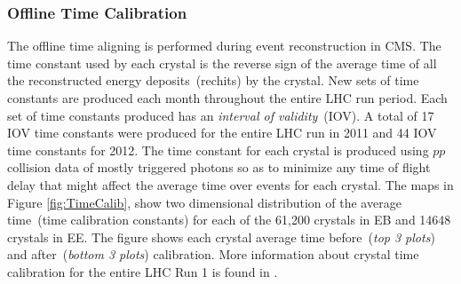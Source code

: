 \subsubsection{Offline Time Calibration}
The offline time aligning is performed during event reconstruction in CMS. The time constant used by each crystal is the reverse sign of the average time of all the reconstructed energy deposits~(rechits) by the crystal. New sets of time constants are produced each month throughout the entire LHC run period. Each set of time constants produced has an \textit{interval of validity}~(IOV).
A total of 17 IOV time constants were produced for the entire LHC run in 2011 and 44 IOV time constants for 2012. The time constant for each crystal is produced using $pp$ collision data of mostly triggered photons so as to minimize any time of flight delay that might affect the average time over events for each crystal. 
The maps in Figure \ref{fig:TimeCalib}, show two dimensional distribution of the average time~(time calibration constants) for each of the 61,200 crystals in EB and 14648 crystals in EE. The figure shows each crystal average time before~(\textit{top 3 plots}) and after~(\textit{bottom 3 plots}) calibration. More information about crystal time calibration for the entire LHC Run 1 is found in \cite{ECALCAL}.
